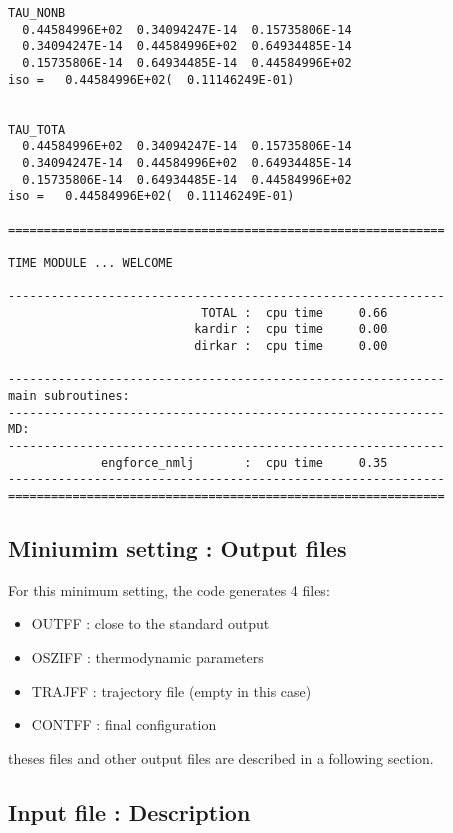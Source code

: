 \documentclass[a4paper]{article}
\begin{document}
\begin{verbatim}
TAU_NONB
  0.44584996E+02  0.34094247E-14  0.15735806E-14
  0.34094247E-14  0.44584996E+02  0.64934485E-14
  0.15735806E-14  0.64934485E-14  0.44584996E+02
iso =   0.44584996E+02(  0.11146249E-01)


TAU_TOTA
  0.44584996E+02  0.34094247E-14  0.15735806E-14
  0.34094247E-14  0.44584996E+02  0.64934485E-14
  0.15735806E-14  0.64934485E-14  0.44584996E+02
iso =   0.44584996E+02(  0.11146249E-01)

=============================================================

TIME MODULE ... WELCOME

-------------------------------------------------------------
                           TOTAL :  cpu time     0.66
                          kardir :  cpu time     0.00
                          dirkar :  cpu time     0.00

-------------------------------------------------------------
main subroutines:
-------------------------------------------------------------
MD:
-------------------------------------------------------------
             engforce_nmlj       :  cpu time     0.35
-------------------------------------------------------------
=============================================================
\end{verbatim}

\subsection{Miniumim setting : Output files}
For this minimum setting, the code generates 4 files:

\begin{itemize}
\item OUTFF  : close to the standard output
\item OSZIFF : thermodynamic parameters 
\item TRAJFF : trajectory file (empty in this case) 
\item CONTFF : final configuration
\end{itemize}
theses files and other output files are described in a following section.

\subsection{Input file : Description}

\end{document}
